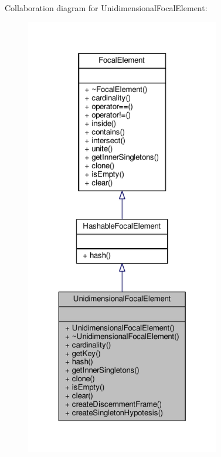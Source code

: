 Collaboration diagram for Unidimensional\+Focal\+Element\+:\nopagebreak
\begin{figure}[H]
\begin{center}
\leavevmode
\includegraphics[height=550pt]{classUnidimensionalFocalElement__coll__graph}
\end{center}
\end{figure}
